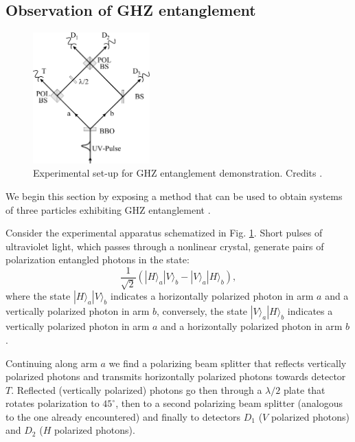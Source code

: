 \subsection{Observation of GHZ entanglement}

\begin{figure}
  \centering
  \includegraphics[width=0.4\textwidth]{Mainmatter/Chapter3/ghz-entanglement.png}
  \caption{Experimental set-up for GHZ entanglement demonstration. Credits \cite{PhysRevLett.82.1345}.}
  \label{fig:ghz-entanglement}
\end{figure}

We begin this section by exposing a method that can be used to obtain systems of three particles exhibiting GHZ entanglement \cite{PhysRevLett.82.1345}.

Consider the experimental apparatus schematized in Fig. \ref{fig:ghz-entanglement}. Short pulses of ultraviolet light, which passes through a nonlinear crystal, generate pairs of polarization entangled photons in the state:
\begin{equation}
  \frac{1}{\sqrt{2}} \left( |H\rangle_a |V\rangle_b - |V\rangle_a |H\rangle_b \right),
\end{equation}
where the state $|H\rangle_a |V\rangle_b$ indicates a horizontally polarized photon in arm $a$ and a vertically polarized photon in arm $b$, conversely, the state $|V\rangle_a |H\rangle_b$ indicates a vertically polarized photon in arm $a$ and a horizontally polarized photon in arm $b$.

Continuing along arm $a$ we find a polarizing beam splitter that reflects vertically polarized photons and transmits horizontally polarized photons towards detector $T$. Reflected (vertically polarized) photons go then through a $\lambda/2$ plate that rotates polarization to $45^\circ$, then to a second polarizing beam splitter (analogous to the one already encountered) and finally to detectors $D_1$ ($V$ polarized photons) and $D_2$ ($H$ polarized photons).

